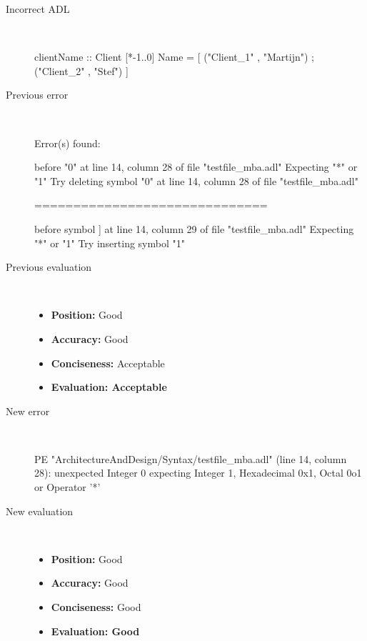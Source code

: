 \hrulefill

\begin{description}
  \item[Incorrect ADL]~\\
\begin{adl}
clientName :: Client [*-1..0] Name =
    [ ("Client_1"      , "Martijn")
    ; ("Client_2"      , "Stef")
    ]\end{adl}
  \item[Previous error]~\\
\begin{haskell}
Error(s) found:

before "0" at line 14, column 28 of file "testfile_mba.adl"
Expecting "*" or "1"
Try deleting symbol "0" at line 14, column 28 of file "testfile_mba.adl"

==============================

before symbol ] at line 14, column 29 of file "testfile_mba.adl"
Expecting "*" or "1"
Try inserting symbol "1"\end{haskell}
  \item[Previous evaluation]~\\
    \begin{itemize}
    \item \textbf{Position:} Good
    \item \textbf{Accuracy:} Good
    \item \textbf{Conciseness:} Acceptable
    \item \textbf{Evaluation: Acceptable}
    \end{itemize}
  \item[New error]~\\
\begin{haskell}
PE "ArchitectureAndDesign/Syntax/testfile_mba.adl" (line 14, column 28):
unexpected Integer 0
expecting Integer 1, Hexadecimal 0x1, Octal 0o1 or Operator '*'\end{haskell}
  \item[New evaluation]~\\
    \begin{itemize}
    \item \textbf{Position:} Good
    \item \textbf{Accuracy:} Good
    \item \textbf{Conciseness:} Good
    \item \textbf{Evaluation: Good}
    \end{itemize}
  \end{description}

